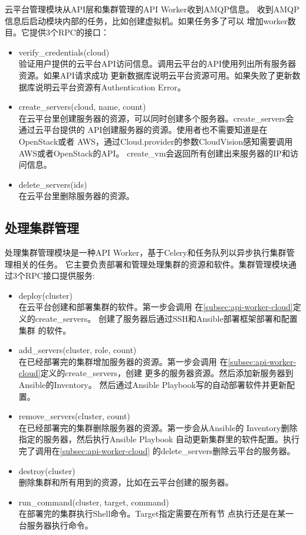 云平台管理模块从API层和集群管理的API Worker收到AMQP信息。
收到AMQP信息后启动模块内部的任务，比如创建虚拟机。如果任务多了可以
增加worker数目。它提供3个RPC的接口：
\begin{itemize}
  \item verify\_credentials(cloud) \\
        验证用户提供的云平台API访问信息。调用云平台的API使用列出所有服务器资源。如果API请求成功
        更新数据库说明云平台资源可用。如果失败了更新数据库说明云平台资源有Authentication Error。
  \item create\_servers(cloud, name, count) \\
        在云平台里创建服务器的资源，可以同时创建多个服务器。create\_servers会通过云平台提供的
        API创建服务器的资源。使用者也不需要知道是在OpenStack或者
        AWS，通过Cloud.provider的参数CloudVision感知需要调用AWS或者OpenStack的API。
        create\_vm会返回所有创建出来服务器的IP和访问信息。
  \item delete\_servers(ids) \\
        在云平台里删除服务器的资源。
\end{itemize}

\subsection{处理集群管理}
\label{subsec:api-worker-cluster}
处理集群管理模块是一种API Worker，基于Celery和任务队列以异步执行集群管理相关的任务。
它主要负责部署和管理处理集群的资源和软件。集群管理模块通过3个RPC接口提供服务:
\begin{itemize}
  \item deploy(cluster) \\
        在云平台创建和部署集群的软件。第一步会调用
        在\ref{subsec:api-worker-cloud}定义的create\_servers。
        创建了服务器后通过SSH和Ansible部署框架部署和配置集群
        的软件。
  \item add\_servers(cluster, role, count) \\
        在已经部署完的集群增加服务器的资源。第一步会调用
        在\ref{subsec:api-worker-cloud}定义的create\_servers，创建
        更多的服务器资源。然后添加新服务器到Ansible的Inventory。
        然后通过Ansible Playbook写的自动部署软件并更新配置。
  \item remove\_servers(cluster, count) \\
        在已经部署完的集群删除服务器的资源。第一步会从Ansible的
        Inventory删除指定的服务器，然后执行Ansible Playbook
        自动更新集群里的软件配置。执行完了调用在\ref{subsec:api-worker-cloud}
        的delete\_servers删除云平台的服务器。
  \item destroy(cluster) \\
        删除集群和所有用到的资源，比如在云平台创建的服务器。
  \item run\_command(cluster, target, command) \\
        在部署完的集群执行Shell命令。Target指定需要在所有节
        点执行还是在某一台服务器执行命令。
\end{itemize}

